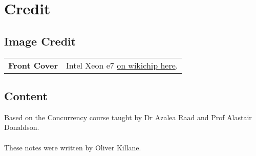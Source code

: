 \chapter{Credit}
\section*{Image Credit}
\begin{center}
	\begin{tabular}{r p{}}
		\textbf{Front Cover} & Intel Xeon e7 \href{https://en.wikichip.org/wiki/File:intel_xeon_e7_die_shot.jpg}{on wikichip here}. \\
	\end{tabular}
\end{center}

\section*{Content}
Based on the Concurrency course taught by Dr Azalea Raad and Prof Alastair Donaldson.
\\
\\ These notes were written by Oliver Killane.
